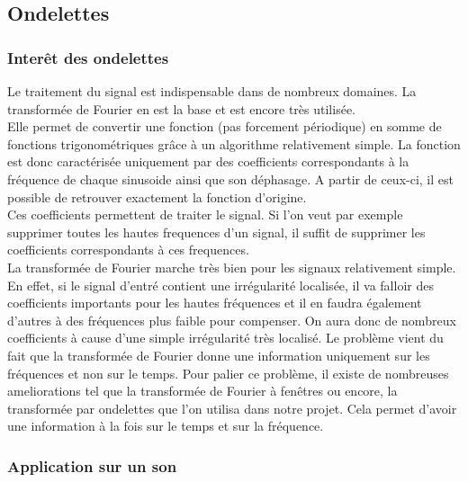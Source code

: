 \documentclass[a4paper,12pt]{article}
\begin{document}
	\subsection{Ondelettes}

        	\subsubsection{Interêt des ondelettes}

Le traitement du signal est indispensable dans de nombreux domaines. La
transformée de Fourier en est la base et est encore très utilisée.\\
Elle permet de convertir une fonction (pas forcement périodique) en somme de
fonctions trigonométriques grâce à un algorithme relativement simple. La
fonction est donc caractérisée uniquement par des coefficients correspondants à
la fréquence de chaque sinusoide ainsi que son déphasage. A partir de ceux-ci,
il est possible de retrouver exactement la fonction d'origine.\\
Ces coefficients permettent de traiter le signal. Si l'on veut par exemple
supprimer toutes les hautes frequences d'un signal, il suffit de supprimer les
coefficients correspondants à ces frequences.\\
La transformée de Fourier marche très bien pour les signaux relativement simple.
En effet, si le signal d'entré contient une irrégularité localisée, il va
falloir des coefficients importants pour les hautes fréquences et il en faudra
également d'autres à des fréquences plus faible pour compenser. On aura donc de
nombreux coefficients à cause d'une simple irrégularité très localisé. Le
problème vient du fait que la transformée de Fourier donne une information
uniquement sur les fréquences et non sur le temps. Pour palier ce problème, il
existe de nombreuses ameliorations tel que la transformée de Fourier à fenêtres
ou encore, la transformée par ondelettes que l'on utilisa dans notre projet.
Cela permet d'avoir une information à la fois sur le temps et sur la
fréquence.\\

		\subsubsection{Application sur un son}
\end{document}
